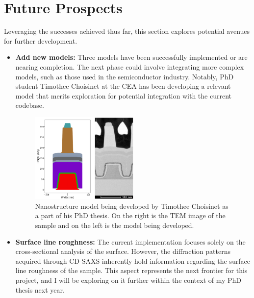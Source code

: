 \section{Future Prospects}

Leveraging the successes achieved thus far, this section explores potential avenues for further development.

\begin{itemize}
    \item \textbf{Add new models:} Three models have been successfully implemented or are 
    nearing completion. The next phase could involve integrating more complex models, 
    such as those used in the semiconductor industry. Notably, PhD student Timothee Choisinet at the CEA has been developing a relevant 
    model that merits exploration for potential integration with the current codebase.

    \begin{figure}[h]
        \centering
        \includegraphics[width=0.5\textwidth]{images/Modele_Timothee.png}
        \caption{Nanostructure model being developed by Timothee Choisinet as a part of his PhD thesis. 
        On the right is the TEM image of the sample and on the left is the model being developed.}
    \end{figure}

    \item \textbf{Surface line roughness:} The current implementation focuses solely on the
     cross-sectional analysis of the surface. However, the diffraction patterns acquired 
     through CD-SAXS inherently hold information regarding the surface line roughness of the 
     sample. This aspect represents the next frontier for this project, and I will be exploring 
     on it further within the context of my PhD thesis next year.


\end{itemize}
